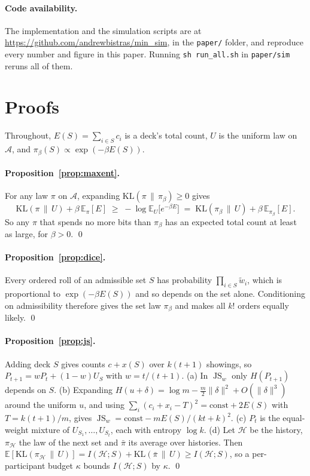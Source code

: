 \documentclass[11pt]{article}
\newcommand{\A}{\mathcal{A}}
\newcommand{\KL}{\mathrm{KL}}
\newcommand{\Unif}{U}
\newcommand{\E}{\mathbb{E}}
\DeclareMathOperator{\JS}{JS}
\begin{document}
\paragraph{Code availability.} The implementation and the simulation scripts are at \url{https://github.com/andrewbistras/min_sim}, in the \texttt{paper/} folder, and reproduce every number and figure in this paper. Running \texttt{sh run\_all.sh} in \texttt{paper/sim} reruns all of them.

\appendix
\section{Proofs}\label{app:proofs}

Throughout, $E(S)=\sum_{i\in S}c_i$ is a deck's total count, $\Unif$ is the uniform law on $\A$, and $\pi_\beta(S)\propto\exp(-\beta E(S))$.

\paragraph{Proposition~\ref{prop:maxent}.} For any law $\pi$ on $\A$, expanding $\KL(\pi\,\|\,\pi_\beta)\ge 0$ gives
\[
\KL(\pi\,\|\,\Unif) + \beta\,\E_\pi[E] \;\ge\; -\log\E_{\Unif}\big[e^{-\beta E}\big] \;=\; \KL(\pi_\beta\,\|\,\Unif) + \beta\,\E_{\pi_\beta}[E].
\]
So any $\pi$ that spends no more bits than $\pi_\beta$ has an expected total count at least as large, for $\beta>0$. \qed

\paragraph{Proposition~\ref{prop:dice}.} Every ordered roll of an admissible set $S$ has probability $\prod_{i\in S}\tilde w_i$, which is proportional to $\exp(-\beta E(S))$ and so depends on the set alone. Conditioning on admissibility therefore gives the set law $\pi_\beta$ and makes all $k!$ orders equally likely. \qed

\paragraph{Proposition~\ref{prop:js}.} Adding deck $S$ gives counts $c+x(S)$ over $k(t+1)$ showings, so $P_{t+1}=wP_t+(1-w)U_S$ with $w=t/(t+1)$.
(a) In $\JS_w$ only $H(P_{t+1})$ depends on $S$.
(b) Expanding $H(u+\delta)=\log m-\frac{m}{2}\|\delta\|^2+O(\|\delta\|^3)$ around the uniform $u$, and using $\sum_i(c_i+x_i-T)^2=\text{const}+2E(S)$ with $T=k(t+1)/m$, gives $\JS_w=\text{const}-mE(S)/(kt+k)^2$.
(c) $P_t$ is the equal-weight mixture of $U_{S_1},\dots,U_{S_t}$, each with entropy $\log k$.
(d) Let $\mathcal{H}$ be the history, $\pi_{\mathcal{H}}$ the law of the next set and $\bar\pi$ its average over histories. Then $\E[\KL(\pi_{\mathcal{H}}\,\|\,\Unif)]=I(\mathcal{H};S)+\KL(\bar\pi\,\|\,\Unif)\ge I(\mathcal{H};S)$, so a per-participant budget $\kappa$ bounds $I(\mathcal{H};S)$ by $\kappa$. \qed
\end{document}
